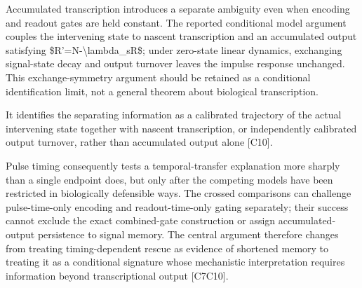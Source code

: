 \documentclass[11pt]{article}
\begin{document}
Accumulated transcription introduces a separate ambiguity even when encoding and readout gates are held constant. The reported conditional model argument couples the intervening state to nascent transcription and an accumulated output satisfying \$R'=N-\textbackslash{}lambda\_sR\$; under zero-state linear dynamics, exchanging signal-state decay and output turnover leaves the impulse response unchanged. This exchange-symmetry argument should be retained as a conditional identification limit, not a general theorem about biological transcription.

It identifies the separating information as a calibrated trajectory of the actual intervening state together with nascent transcription, or independently calibrated output turnover, rather than accumulated output alone [C10].

Pulse timing consequently tests a temporal-transfer explanation more sharply than a single endpoint does, but only after the competing models have been restricted in biologically defensible ways. The crossed comparisons can challenge pulse-time-only encoding and readout-time-only gating separately; their success cannot exclude the exact combined-gate construction or assign accumulated-output persistence to signal memory. The central argument therefore changes from treating timing-dependent rescue as evidence of shortened memory to treating it as a conditional signature whose mechanistic interpretation requires information beyond transcriptional output [C7\textendash{}C10].
\end{document}
